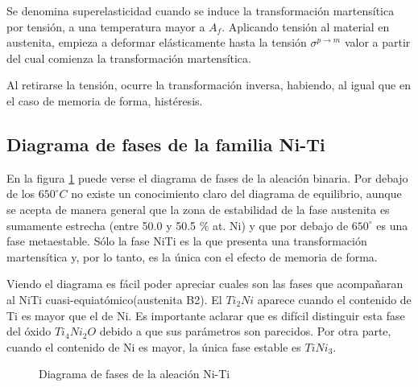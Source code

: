 \documentclass[12pt]{article}
\theoremstyle{definition}
\theoremstyle{remark}
\begin{document}
Se denomina superelasticidad cuando se induce la transformación martensítica por tensión, a una temperatura mayor a $A_f$. Aplicando tensión al material en austenita, empieza a deformar elásticamente hasta la tensión $\sigma^{p \rightarrow m}$ valor a partir del cual comienza la transformación martensítica.

Al retirarse la tensión, ocurre la transformación inversa, habiendo, al igual que en el caso de memoria de forma, histéresis.


\subsection{Diagrama de fases de la familia Ni-Ti}

En la figura \ref{PhaseDiagram} puede verse el diagrama de fases de la aleación binaria. Por debajo de los $650 ^\circ C$ no existe un conocimiento claro del diagrama de equilibrio, aunque se acepta de manera general que la zona de estabilidad de la fase austenita es sumamente estrecha (entre 50.0 y 50.5 \% at. Ni) y que por debajo de $650^\circ$ es una fase metaestable. Sólo la fase NiTi es la que presenta una transformación martensítica y, por lo tanto, es la única con el efecto de memoria de forma.

Viendo el diagrama es fácil poder apreciar cuales son las fases que acompañaran al NiTi cuasi-equiatómico(austenita B2). El $Ti_2Ni$ aparece cuando el contenido de Ti es mayor que el de Ni. Es importante aclarar que es difícil distinguir esta fase del óxido $Ti_4Ni_2O$ debido a que sus parámetros son parecidos. Por otra parte, cuando el contenido de Ni es mayor, la única fase estable es $TiNi_3$.

\begin{figure}[H]
	\centering
	\caption{Diagrama de fases de la aleación Ni-Ti}
	\label{PhaseDiagram}
\end{figure}
\end{document}
